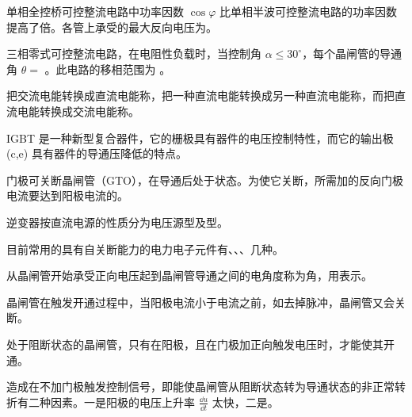 \documentclass[电力电子]{subfiles}
\begin{document}
\begin{ti}
	单相全控桥可控整流电路中功率因数 $\cos\varphi$ 比单相半波可控整流电路的功率因数提高了倍。各管上承受的最大反向电压为。
\end{ti}

\begin{ti}
	三相零式可控整流电路，在电阻性负载时，当控制角 $\alpha \leq 30^\circ$，每个晶闸管的导通角 $\theta = $ 。此电路的移相范围为 。
\end{ti}

\begin{ti}
	把交流电能转换成直流电能称，把一种直流电能转换成另一种直流电能称，而把直流电能转换成交流电能称。
\end{ti}

\begin{ti}
	IGBT 是一种新型复合器件，它的栅极具有器件的电压控制特性，而它的输出极 (c,e) 具有器件的导通压降低的特点。
\end{ti}

\begin{ti}
	门极可关断晶闸管（GTO），在导通后处于状态。为使它关断，所需加的反向门极电流要达到阳极电流的。
\end{ti}

\begin{ti}
	逆变器按直流电源的性质分为电压源型及型。
\end{ti}

\begin{ti}
	目前常用的具有自关断能力的电力电子元件有、、、几种。
\end{ti}

\begin{ti}
	从晶闸管开始承受正向电压起到晶闸管导通之间的电角度称为角，用\hua{$\alpha$}表示。
\end{ti}

\begin{ti}
	晶闸管在触发开通过程中，当阳极电流小于电流之前，如去掉脉冲，晶闸管又会关断。
\end{ti}

\begin{ti}
	处于阻断状态的晶闸管，只有在阳极，且在门极加正向触发电压时，才能使其开通。
\end{ti}

\begin{ti}
	造成在不加门极触发控制信号，即能使晶闸管从阻断状态转为导通状态的非正常转折有二种因素。一是阳极的电压上升率 $\frac{\dd{u}}{\dd{t}}$ 太快，二是。
\end{ti}
\end{document}
